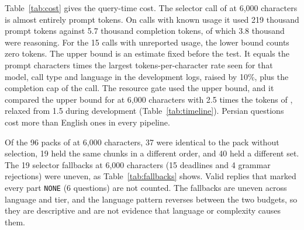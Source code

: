 Table~\ref{tab:cost} gives the query-time cost.
The selector call of \lexb{} at 6,000 characters is almost entirely prompt tokens.
On calls with known usage it used 219 thousand prompt tokens against 5.7 thousand completion tokens, of which 3.8 thousand were reasoning.
For the 15 calls with unreported usage, the lower bound counts zero tokens.
The upper bound is an estimate fixed before the test. It equals the prompt characters times the largest tokens-per-character rate seen for that model, call type and language in the development logs, raised by 10\%, plus the completion cap of the call.
The resource gate used the upper bound, and it compared the upper bound for \lexb{} at 6,000 characters with 2.5 times the tokens of \hybrid{}, relaxed from 1.5 during development (Table~\ref{tab:timeline}).
Persian questions cost more than English ones in every pipeline.

Of the 96 packs of \lexb{} at 6,000 characters, 37 were identical to the pack without selection, 19 held the same chunks in a different order, and 40 held a different set.
The 19 selector fallbacks at 6,000 characters (15 deadlines and 4 grammar rejections) were uneven, as Table~\ref{tab:fallbacks} shows.
Valid replies that marked every part \texttt{NONE} (6 questions) are not counted.
The fallbacks are uneven across language and tier, and the language pattern reverses between the two budgets, so they are descriptive and are not evidence that language or complexity causes them.


